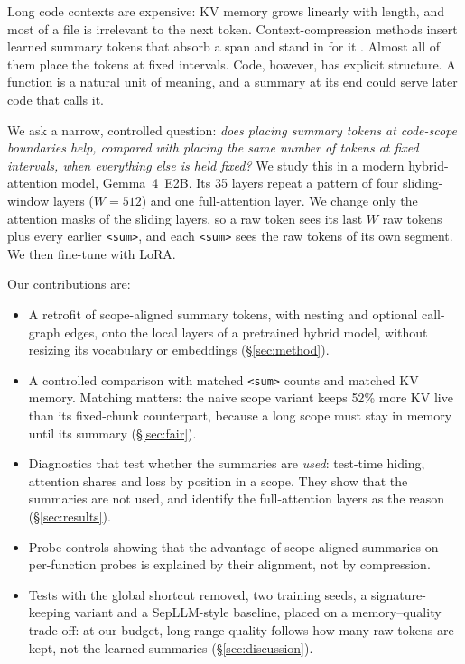 \documentclass[11pt]{article}
\newcommand{\sumtok}{\texttt{<sum>}}
\begin{document}
Long code contexts are expensive: KV memory grows linearly with length, and
most of a file is irrelevant to the next token. Context-compression methods
insert learned summary tokens that absorb a span and stand in for it
\citep{mu2023gist,chevalier2023autocompressor,ge2023icae,zhang2024beacon}.
Almost all of them place the tokens at fixed intervals. Code, however, has
explicit structure. A function is a natural unit of meaning, and a summary at
its end could serve later code that calls it.

We ask a narrow, controlled question: \emph{does placing summary tokens at
code-scope boundaries help, compared with placing the same number of tokens
at fixed intervals, when everything else is held fixed?} We study this in a
modern hybrid-attention model, Gemma~4~E2B. Its 35 layers repeat a pattern of
four sliding-window layers ($W=512$) and one full-attention layer. We change
only the attention masks of the sliding layers, so a raw token sees its last
$W$ raw tokens plus every earlier \sumtok{}, and each \sumtok{} sees the raw
tokens of its own segment. We then fine-tune with LoRA.

Our contributions are:
\begin{itemize}
\item A retrofit of scope-aligned summary tokens, with nesting and optional
  call-graph edges, onto the local layers of a pretrained hybrid model,
  without resizing its vocabulary or embeddings (\S\ref{sec:method}).
\item A controlled comparison with matched \sumtok{} counts and matched KV
  memory. Matching matters: the naive scope variant keeps 52\% more KV live
  than its fixed-chunk counterpart, because a long scope must stay in memory
  until its summary (\S\ref{sec:fair}).
\item Diagnostics that test whether the summaries are \emph{used}: test-time
  hiding, attention shares and loss by position in a scope. They show that
  the summaries are not used, and identify the full-attention layers as the
  reason (\S\ref{sec:results}).
\item Probe controls showing that the advantage of scope-aligned summaries on
  per-function probes is explained by their alignment, not by compression.
\item Tests with the global shortcut removed, two training seeds, a
  signature-keeping variant and a SepLLM-style baseline, placed on a
  memory--quality trade-off: at our budget, long-range quality follows how
  many raw tokens are kept, not the learned summaries (\S\ref{sec:discussion}).
\end{itemize}
\end{document}
